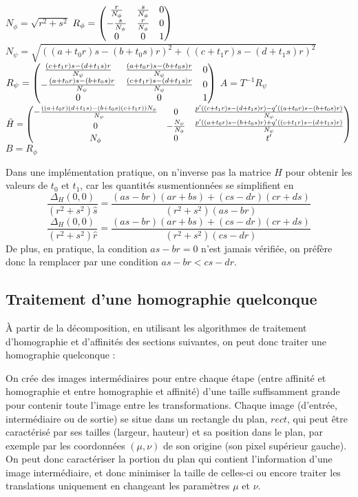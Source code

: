    \begin{algorithme}
     \label{pseudoCodeDecompo}
     \caption{$decomposition(H)$}
     $N_\phi = \sqrt{r^2+s^2}$\;
     $R_\phi = \begin{pmatrix} 
      \frac{r}{N_\phi} & \frac{s}{N_\phi} & 0\\
      -\frac{s}{N_\phi} & \frac{r}{N_\phi} & 0\\
      0 & 0 & 1 \end{pmatrix}$\;
     $N_\psi = \sqrt{((a+t_0r)s-(b+t_0s)r)^2+((c+t_1r)s-(d+t_1s)r)^2}$\;
     $R_\psi = \begin{pmatrix} 
      \frac{(c+t_1r)s-(d+t_1s)r}{N_\psi} & \frac{(a+t_0r)s-(b+t_0s)r}{N_\psi} & 0\\
      -\frac{(a+t_0r)s-(b+t_0s)r}{N_\psi} & \frac{(c+t_1r)s-(d+t_1s)r}{N_\psi} & 0\\
      0 & 0 & 1 \end{pmatrix}$\;
     $A = T^{-1}R_\psi$\;
     $\tilde H = \begin{pmatrix} 
      -\frac{((a+t_0r)(d+t_1s)-(b+t_0s)(c+t_1r))N_\phi}{N_\psi} & 0 & \frac{p'((c+t_1r)s-(d+t_1s)r)-q'((a+t_0r)s-(b+t_0s)r)}{N_\psi}\\
      0 & -\frac{N_\psi}{N_\phi} & \frac{p'((a+t_0r)s-(b+t_0s)r)+q'((c+t_1r)s-(d+t_1s)r)}{N_\psi}\\
      N_\phi & 0 & t' \end{pmatrix}$\;
     $B = R_\phi$\;
   \end{algorithme}
   Dans une implémentation pratique, on n'inverse pas la matrice $H$ pour obtenir les valeurs de $t_0$ et $t_1$, car les quantités susmentionnées se simplifient en
 \[\frac{\Delta_H(0,0)}{(r^2+s^2)\hat s} = \frac{(as-br)(ar+bs)+(cs-dr)(cr+ds)}{(r^2+s^2)(as-br)}\]
 \[\frac{\Delta_H(0,0)}{(r^2+s^2)\hat r} = \frac{(as-br)(ar+bs)+(cs-dr)(cr+ds)}{(r^2+s^2)(cs-dr)}\]
 De plus, en pratique, la condition $as-br=0$ n'est jamais vérifiée, on préfère donc la remplacer par une condition $as-br<cs-dr$.

\subsection{Traitement d'une homographie quelconque}
 \label{translainsta}
 À partir de la décomposition, en utilisant les algorithmes de traitement d'homographie et d'affinités des sections suivantes, on peut donc traiter une homographie quelconque :
 
 On crée des images intermédiaires pour entre chaque étape (entre affinité et homographie et entre homographie et affinité) d'une taille suffisamment grande pour contenir toute l'image entre les transformations. Chaque image (d'entrée, intermédiaire ou de sortie) se situe dans un rectangle du plan, $rect$, qui peut être caractérisé par ses tailles (largeur, hauteur) et sa position dans le plan, par exemple par les coordonnées $(\mu,\nu)$ de son origine (son pixel supérieur gauche). On peut donc caractériser la portion du plan qui contient l'information d'une image intermédiaire, et donc minimiser la taille de celles-ci ou encore traiter les translations uniquement en changeant les paramètres $\mu$ et $\nu$.
 
